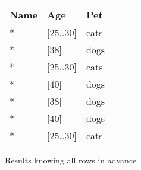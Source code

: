\begin{figure}[H]
    \centering
    \begin{tabular}{l l l}
        \toprule
        \textbf{Name} & \textbf{Age} & \textbf{Pet} \\
        \midrule
        *	& [25..30]	& cats \\
        *	& [38]	    & dogs \\
        *	& [25..30]	& cats \\
        *	& [40]	    & dogs \\
        *	& [38]	    & dogs \\
        *	& [40]	    & dogs \\
        *	& [25..30]	& cats \\
        \bottomrule
    \end{tabular}
    \caption{Results knowing all rows in advance}\label{fig:continuous_alt}
\end{figure}